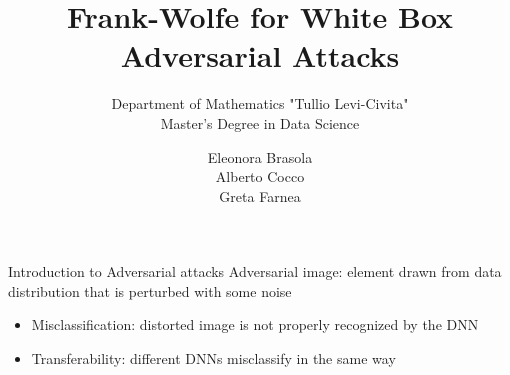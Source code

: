 \documentclass{beamer}
\title{Frank-Wolfe for White Box Adversarial Attacks}
\subtitle{\normalsize Department of Mathematics "Tullio Levi-Civita"\\
Master's Degree in Data Science}
\author[Greta Farnea]{\large Eleonora Brasola \\ Alberto Cocco \\ Greta Farnea}
\date{\vspace{.5cm} \;}
\institute[]{Università di Padova}
\theoremstyle{plain}
\theoremstyle{definition}
\begin{document}
\begin{frame}
\maketitle
\end{frame}

\begin{frame}{Introduction to Adversarial attacks}
Adversarial image: element drawn from data distribution that is perturbed with some noise
    \begin{itemize}
            \item Misclassification: distorted image is not properly recognized by the DNN
            \item Transferability: different DNNs misclassify in the same way
    \end{itemize}
\medskip


\end{frame}
\end{document}

